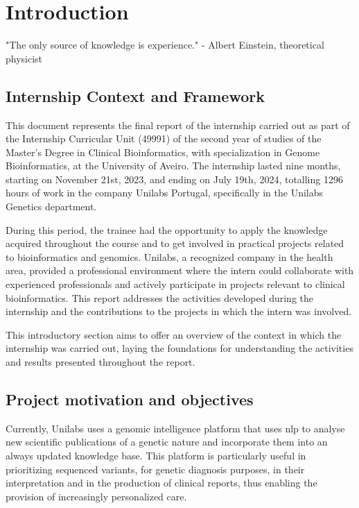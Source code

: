 \chapter{Introduction} 
\label{chapter:introduction}

\begin{introduction}
    "The only source of knowledge is experience." - Albert Einstein, theoretical physicist
\end{introduction}



\section{Internship Context and Framework} \label{sec:intro_context}

This document represents the final report of the internship carried out as part of the Internship Curricular Unit (49991) of the second year of studies of the Master's Degree in Clinical Bioinformatics, with specialization in Genome Bioinformatics, at the University of Aveiro. The internship lasted nine months, starting on November 21st, 2023, and ending on July 19th, 2024, totalling 1296 hours of work in the company Unilabs Portugal, specifically in the Unilabs Genetics department. 

During this period, the trainee had the opportunity to apply the knowledge acquired throughout the course and to get involved in practical projects related to bioinformatics and genomics. Unilabs, a recognized company in the health area, provided a professional environment where the intern could collaborate with experienced professionals and actively participate in projects relevant to clinical bioinformatics. This report addresses the activities developed during the internship and the contributions to the projects in which the intern was involved. 

This introductory section aims to offer an overview of the context in which the internship was carried out, laying the foundations for understanding the activities and results presented throughout the report.


\section{Project motivation and objectives} \label{sec:intro_motivation}

Currently, Unilabs uses a genomic intelligence platform that uses \ac{nlp} to analyse new scientific publications of a genetic nature and incorporate them into an always updated knowledge base. This platform is particularly useful in prioritizing sequenced variants, for genetic diagnosis purposes, in their interpretation and in the production of clinical reports, thus enabling the provision of increasingly personalized care. 

